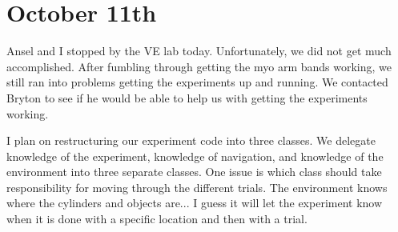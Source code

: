 \documentclass{article}
\begin{document}
\section*{October 11th}
Ansel and I stopped by the VE lab today.
Unfortunately, we did not get much accomplished.
After fumbling through getting the myo arm bands working,
we still ran into problems getting the experiments up and running.
We contacted Bryton to see if he would be able to help us with getting
the experiments working.

I plan on restructuring our experiment code into three classes.
We delegate knowledge of the experiment, knowledge of navigation, and knowledge of the environment
into three separate classes.
One issue is which class should take responsibility for moving through the different trials.
The environment knows where the cylinders and objects are...
I guess it will let the experiment know when it is done with a specific location and then with a trial.
\end{document}
